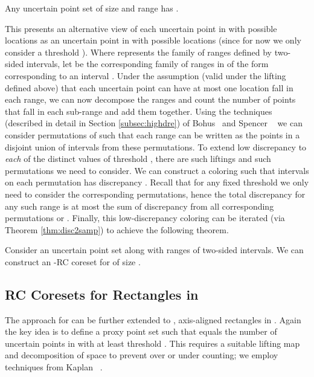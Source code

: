 \documentclass[11pt]{myclass}
\newcommand{\RC}{\textsf{RC}\xspace}
\begin{document}
\begin{corollary}
Any uncertain point set  of size  and range  has .  
\end{corollary}

This presents an alternative view of each uncertain point in  with  possible locations as an uncertain point in  with  possible locations (since for now we only consider a threshold ).  Where  represents the family of ranges defined by two-sided intervals, let  be the corresponding family of ranges in  of the form  corresponding to an interval .  Under the assumption (valid under the lifting defined above) that each uncertain point can have at most one location fall in each range, we can now decompose the ranges and count the number of points that fall in each sub-range and add them together.  
Using the techniques (described in detail in Section \ref{subsec:highdre}) of Bohus~\cite{bohus} and Spencer \etal~\cite{spencer} we can consider  permutations of  such that each range  can be written as the points in a disjoint union of intervals from these permutations.  
To extend low discrepancy to \emph{each} of the  distinct values of threshold , there are  such liftings and  such permutations we need to consider.   We can construct a coloring  such that intervals on each permutation has discrepancy . Recall that for any fixed threshold  we only need to consider the corresponding  permutations, hence the total discrepancy for any such range is at most the sum of discrepancy from all corresponding 
 permutations or .  
Finally, this low-discrepancy coloring can be iterated (via Theorem \ref{thm:disc2samp}) to achieve the following theorem.  

\begin{theorem}\label{thm:rcsample1d}
Consider an uncertain point set  along with ranges  of two-sided intervals.  We can construct an -RC coreset  for  of size .  
\end{theorem}
 


\subsection{\RC Coresets for Rectangles in }

The approach for  can be further extended to , axis-aligned rectangles in . Again the key idea
is to define a proxy point set  such that  equals the number of uncertain points in  with
at least threshold . This requires a suitable lifting map and decomposition of space to prevent over or under counting;
we employ techniques from Kaplan \etal~\cite{colors}.
\end{document}
